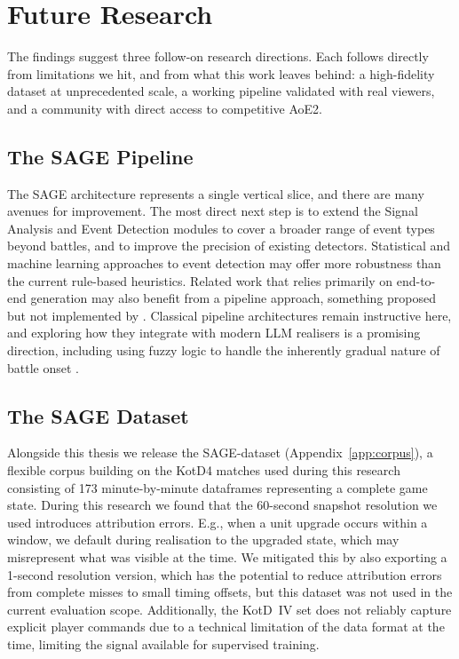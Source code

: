 \section{Future Research}
The findings suggest three follow-on research directions. Each follows directly from limitations we hit, and from what this work leaves behind: a high-fidelity dataset at unprecedented scale, a working pipeline validated with real viewers, and a community with direct access to competitive AoE2.

\subsection{The SAGE Pipeline}

The SAGE architecture represents a single vertical slice, and there are many avenues for improvement. The most direct next step is to extend the Signal Analysis and Event Detection modules to cover a broader range of event types beyond battles, and to improve the precision of existing detectors. Statistical and machine learning approaches to event detection may offer more robustness than the current rule-based heuristics. Related work that relies primarily on end-to-end generation \cite{wang2021,zhang2024} may also benefit from a pipeline approach, something proposed but not implemented by \citet{zheng2025}. Classical pipeline architectures \cite{reiter2000} remain instructive here, and exploring how they integrate with modern LLM realisers is a promising direction, including using fuzzy logic to handle the inherently gradual nature of battle onset \cite{ramos2019}.

\subsection{The SAGE Dataset}
Alongside this thesis we release the SAGE-dataset (Appendix~\ref{app:corpus}), a flexible corpus building on the KotD4 matches used during this research consisting of 173 minute-by-minute dataframes representing a complete game state. During this research we found that the 60-second snapshot resolution we used introduces attribution errors. E.g., when a unit upgrade occurs within a window, we default during realisation to the upgraded state, which may misrepresent what was visible at the time. We mitigated this by also exporting a 1-second resolution version, which has the potential to reduce attribution errors from complete misses to small timing offsets, but this dataset was not used in the current evaluation scope. Additionally, the KotD~IV set does not reliably capture explicit player commands due to a technical limitation of the data format at the time, limiting the signal available for supervised training.

